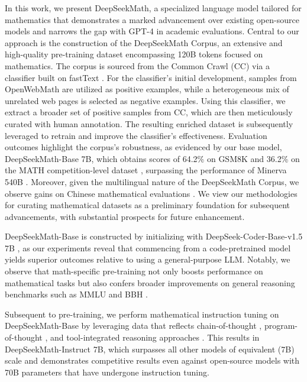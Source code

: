 In this work, we present DeepSeekMath, a specialized language model tailored for mathematics that demonstrates a marked advancement over existing open-source models and narrows the gap with GPT-4 in academic evaluations. Central to our approach is the construction of the DeepSeekMath Corpus, an extensive and high-quality pre-training dataset encompassing 120B tokens focused on mathematics. The corpus is sourced from the Common Crawl (CC) via a classifier built on fastText \citep{joulin2016fasttext}. For the classifier’s initial development, samples from OpenWebMath \citep{openwebmath} are utilized as positive examples, while a heterogeneous mix of unrelated web pages is selected as negative examples. Using this classifier, we extract a broader set of positive samples from CC, which are then meticulously curated with human annotation. The resulting enriched dataset is subsequently leveraged to retrain and improve the classifier’s effectiveness. Evaluation outcomes highlight the corpus's robustness, as evidenced by our base model, DeepSeekMath-Base 7B, which obtains scores of 64.2\% on GSM8K \citep{gsm8k} and 36.2\% on the MATH competition-level dataset \citep{MATH}, surpassing the performance of Minerva 540B \citep{minerva}. Moreover, given the multilingual nature of the DeepSeekMath Corpus, we observe gains on Chinese mathematical evaluations \citep{wei2023cmath,agieval}. We view our methodologies for curating mathematical datasets as a preliminary foundation for subsequent advancements, with substantial prospects for future enhancement.

DeepSeekMath-Base is constructed by initializing with DeepSeek-Coder-Base-v1.5 7B \citep{deepseek-coder}, as our experiments reveal that commencing from a code-pretrained model yields superior outcomes relative to using a general-purpose LLM. Notably, we observe that math-specific pre-training not only boosts performance on mathematical tasks but also confers broader improvements on general reasoning benchmarks such as MMLU \citep{mmlu} and BBH \citep{bbh}.

Subsequent to pre-training, we perform mathematical instruction tuning on DeepSeekMath-Base by leveraging data that reflects chain-of-thought \citep{cot}, program-of-thought \citep{pot,pal}, and tool-integrated reasoning approaches \citep{tora}. This results in DeepSeekMath-Instruct 7B, which surpasses all other models of equivalent (7B) scale and demonstrates competitive results even against open-source models with 70B parameters that have undergone instruction tuning.

